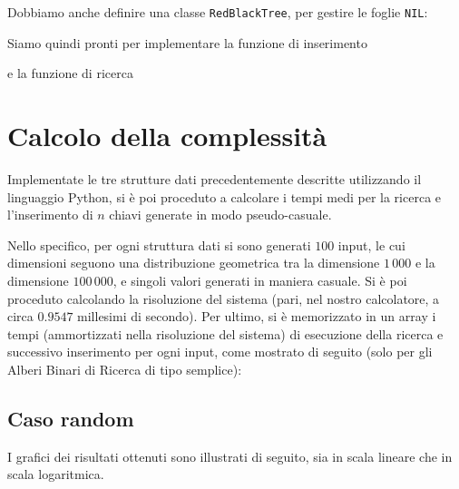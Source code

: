 \documentclass[11pt,a4paper,italian]{article}
\begin{document}
Dobbiamo anche definire una classe \texttt{RedBlackTree}, per gestire le foglie \texttt{NIL}:


Siamo quindi pronti per implementare la funzione di inserimento

e la funzione di ricerca




\section{Calcolo della complessità}
Implementate le tre strutture dati precedentemente descritte utilizzando il linguaggio Python, si è poi proceduto a calcolare i tempi medi per la ricerca e l'inserimento di $n$ chiavi generate in modo pseudo-casuale.

Nello specifico, per ogni struttura dati si sono generati $100$ input, le cui dimensioni seguono una distribuzione geometrica tra la dimensione $1\,000$ e la dimensione $100\,000$, e singoli valori generati in maniera casuale. Si è poi proceduto calcolando la risoluzione del sistema (pari, nel nostro calcolatore, a circa $0.9547$ millesimi di secondo). Per ultimo, si è memorizzato in un array i tempi (ammortizzati nella risoluzione del sistema) di esecuzione della ricerca e successivo inserimento per ogni input, come mostrato di seguito (solo per gli Alberi Binari di Ricerca di tipo semplice):



\subsection{Caso random}
I grafici dei risultati ottenuti sono illustrati di seguito, sia in scala lineare che in scala logaritmica.
\end{document}
